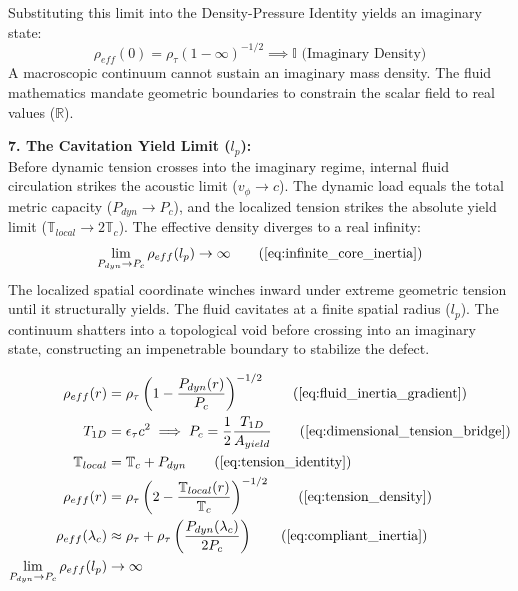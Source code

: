 \documentclass[11pt, a4paper]{article}
\begin{document}
Substituting this limit into the Density-Pressure Identity yields an imaginary state:
\begin{equation}
    \rho_{eff}(0) = \rho_{\tau} (1 - \infty)^{-1/2} \implies \mathbb{I} \text{ (Imaginary Density)} \nonumber
\end{equation}
A macroscopic continuum cannot sustain an imaginary mass density. The fluid mathematics mandate geometric boundaries to constrain the scalar field to real values ($\mathbb{R}$).

\textbf{7. The Cavitation Yield Limit ($l_p$):} \\
Before dynamic tension crosses into the imaginary regime, internal fluid circulation strikes the acoustic limit ($v_\phi \to c$). The dynamic load equals the total metric capacity ($P_{dyn} \to P_c$), and the localized tension strikes the absolute yield limit ($\mathbb{T}_{local} \to 2\mathbb{T}_c$). The effective density diverges to a real infinity:
\begin{equation}
    \lim_{P_{dyn} \to P_c} \rho_{eff}(l_p) \to \infty \tag{\ref{eq:infinite_core_inertia}}
\end{equation}
The localized spatial coordinate winches inward under extreme geometric tension until it structurally yields. The fluid cavitates at a finite spatial radius ($l_p$). The continuum shatters into a topological void before crossing into an imaginary state, constructing an impenetrable boundary to stabilize the defect.

\begin{tcolorbox}[recallbox, title={\ref{box:fluid_inertia}. Origin of Inertia (Strain Compactness \& Tension)}]
\begin{align}
    \rho_{eff}(r) &= \rho_{\tau} \left( 1 - \frac{P_{dyn}(r)}{P_c} \right)^{-1/2} \tag{\ref{eq:fluid_inertia_gradient}} \\
    T_{1D} &= \epsilon_{\tau} c^2 \implies P_c = \frac{1}{2} \frac{T_{1D}}{A_{yield}} \tag{\ref{eq:dimensional_tension_bridge}} \\
    \mathbb{T}_{local} &= \mathbb{T}_c + P_{dyn} \tag{\ref{eq:tension_identity}} \\
    \rho_{eff}(r) &= \rho_{\tau} \left( 2 - \frac{\mathbb{T}_{local}(r)}{\mathbb{T}_c} \right)^{-1/2} \tag{\ref{eq:tension_density}} \\
    \rho_{eff}(\lambda_c) &\approx \rho_{\tau} + \rho_{\tau} \left( \frac{P_{dyn}(\lambda_c)}{2P_c} \right) \tag{\ref{eq:compliant_inertia}} \\
    \lim_{P_{dyn} \to P_c} \rho_{eff}(l_p) &\to \infty \label{eq:infinite_core_inertia}
\end{align}
\end{tcolorbox}
\end{document}
